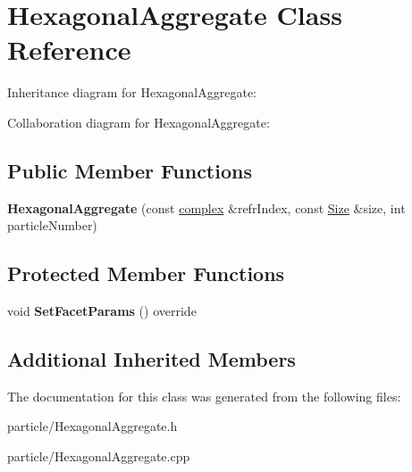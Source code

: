 \hypertarget{class_hexagonal_aggregate}{}\section{Hexagonal\+Aggregate Class Reference}
\label{class_hexagonal_aggregate}


Inheritance diagram for Hexagonal\+Aggregate\+:


Collaboration diagram for Hexagonal\+Aggregate\+:
\subsection*{Public Member Functions}
\begin{DoxyCompactItemize}
\item 
\mbox{\label{class_hexagonal_aggregate_a3ebac4728ad288d82ac7506c1e4a6d16}} 
{\bfseries Hexagonal\+Aggregate} (const \mbox{\hyperlink{classcomplex}{complex}} \&refr\+Index, const \mbox{\hyperlink{struct_size}{Size}} \&size, int particle\+Number)
\end{DoxyCompactItemize}
\subsection*{Protected Member Functions}
\begin{DoxyCompactItemize}
\item 
\mbox{\label{class_hexagonal_aggregate_af6bec3e2933468de2d82efb7368bb7d1}} 
void {\bfseries Set\+Facet\+Params} () override
\end{DoxyCompactItemize}
\subsection*{Additional Inherited Members}


The documentation for this class was generated from the following files\+:\begin{DoxyCompactItemize}
\item 
particle/Hexagonal\+Aggregate.\+h\item 
particle/Hexagonal\+Aggregate.\+cpp\end{DoxyCompactItemize}
